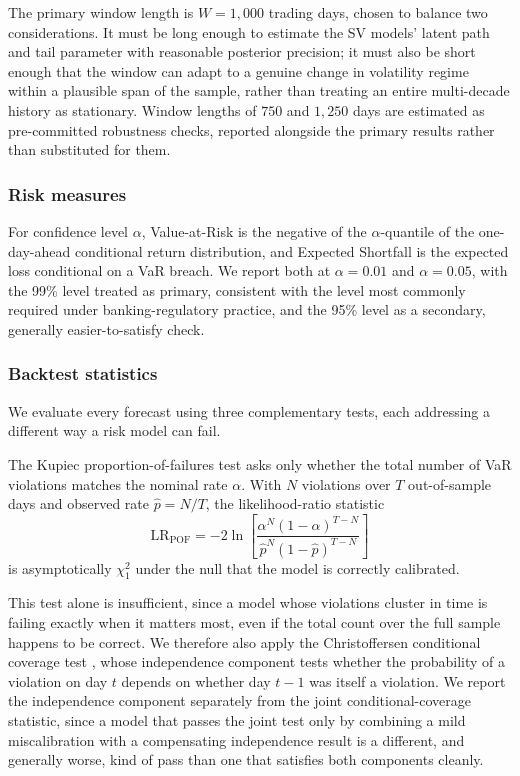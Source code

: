 \documentclass[preprint,12pt,authoryear]{elsarticle}
\begin{document}
The primary window length is $W = 1{,}000$ trading days, chosen to balance two considerations. It must be long enough to estimate the SV models' latent path and tail parameter with reasonable posterior precision; it must also be short enough that the window can adapt to a genuine change in volatility regime within a plausible span of the sample, rather than treating an entire multi-decade history as stationary. Window lengths of $750$ and $1{,}250$ days are estimated as pre-committed robustness checks, reported alongside the primary results rather than substituted for them.

\subsubsection{Risk measures}

For confidence level $\alpha$, Value-at-Risk is the negative of the $\alpha$-quantile of the one-day-ahead conditional return distribution, and Expected Shortfall is the expected loss conditional on a VaR breach. We report both at $\alpha = 0.01$ and $\alpha = 0.05$, with the 99\% level treated as primary, consistent with the level most commonly required under banking-regulatory practice, and the 95\% level as a secondary, generally easier-to-satisfy check.

\subsubsection{Backtest statistics}

We evaluate every forecast using three complementary tests, each addressing a different way a risk model can fail.

The Kupiec proportion-of-failures test \citep{kupiec1995} asks only whether the total number of VaR violations matches the nominal rate $\alpha$. With $N$ violations over $T$ out-of-sample days and observed rate $\hat{p} = N/T$, the likelihood-ratio statistic
\begin{equation}
  \text{LR}_{\text{POF}} = -2\ln\!\left[\frac{\alpha^N (1-\alpha)^{T-N}}{\hat{p}^N (1-\hat{p})^{T-N}}\right]
  \label{eq:kupiec}
\end{equation}
is asymptotically $\chi^2_1$ under the null that the model is correctly calibrated.

This test alone is insufficient, since a model whose violations cluster in time is failing exactly when it matters most, even if the total count over the full sample happens to be correct. We therefore also apply the Christoffersen conditional coverage test \citep{christoffersen1998}, whose independence component tests whether the probability of a violation on day $t$ depends on whether day $t-1$ was itself a violation. We report the independence component separately from the joint conditional-coverage statistic, since a model that passes the joint test only by combining a mild miscalibration with a compensating independence result is a different, and generally worse, kind of pass than one that satisfies both components cleanly.
\end{document}
